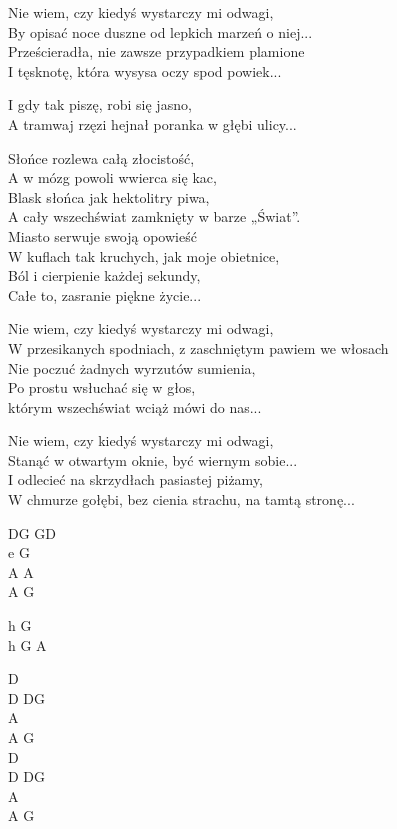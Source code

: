 \begin{text}
Nie wiem, czy kiedyś wystarczy mi odwagi,\\
By opisać noce duszne od lepkich marzeń o niej...\\
Prześcieradła, nie zawsze przypadkiem plamione\\
I tęsknotę, która wysysa oczy spod powiek...

\vin I gdy tak piszę, robi się jasno,\\
\vin A tramwaj rzęzi hejnał poranka w głębi ulicy...

\vin Słońce rozlewa całą złocistość,\\
\vin A w mózg powoli wwierca się kac,\\
\vin Blask słońca jak hektolitry piwa,\\
\vin A cały wszechświat zamknięty w barze „Świat”.\\
\vin Miasto serwuje swoją opowieść\\
\vin W kuflach tak kruchych, jak moje obietnice,\\
\vin Ból i cierpienie każdej sekundy,\\
\vin Całe to, zasranie piękne życie...

Nie wiem, czy kiedyś wystarczy mi odwagi,\\
W przesikanych spodniach, z zaschniętym pawiem we włosach\\
Nie poczuć żadnych wyrzutów sumienia,\\
Po prostu wsłuchać się w głos,\\
którym wszechświat wciąż mówi do nas...

Nie wiem, czy kiedyś wystarczy mi odwagi,\\
Stanąć w otwartym oknie, być wiernym sobie...\\
I odlecieć na skrzydłach pasiastej piżamy,\\
W chmurze gołębi, bez cienia strachu, na tamtą stronę...
\end{text}
\begin{chord}
    DG GD\\
    e G\\
    A A\\
    A G

    h G\\
    h G A

    D\\
    D DG\\
    A\\
    A G\\
    D\\
    D DG\\
    A\\
    A G
\end{chord}